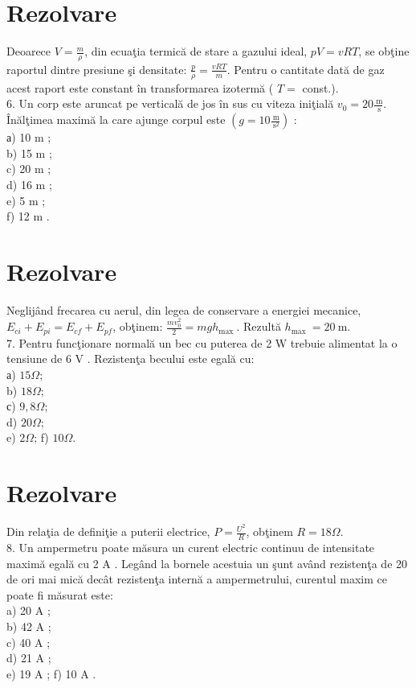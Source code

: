 \section*{Rezolvare}
Deoarece $V=\frac{m}{\rho}$, din ecuaţia termică de stare a gazului ideal, $p V=v R T$, se obţine raportul dintre presiune şi densitate: $\frac{p}{\rho}=\frac{v R T}{m}$. Pentru o cantitate dată de gaz acest raport este constant în transformarea izotermă ( $T=$ const.).\\
6. Un corp este aruncat pe verticală de jos în sus cu viteza iniţială $v_{0}=20 \frac{\mathrm{~m}}{\mathrm{~s}}$. Înălţimea maximă la care ajunge corpul este $\left(g=10 \frac{\mathrm{~m}}{\mathrm{~s}^{2}}\right)$ :\\
а) 10 m ;\\
b) 15 m ;\\
c) 20 m ;\\
d) 16 m ;\\
e) 5 m ;\\
f) 12 m .

\section*{Rezolvare}
Neglijând frecarea cu aerul, din legea de conservare a energiei mecanice, $E_{c i}+E_{p i}=E_{c f}+E_{p f}$, obţinem: $\frac{m v_{0}^{2}}{2}=m g h_{\text {max }}$. Rezultă $h_{\text {max }}=20 \mathrm{~m}$.\\
7. Pentru funcţionare normală un bec cu puterea de 2 W trebuie alimentat la o tensiune de 6 V . Rezistenţa becului este egală cu:\\
а) $15 \Omega$;\\
b) $18 \Omega$;\\
с) $9,8 \Omega$;\\
d) $20 \Omega$;\\
e) $2 \Omega$; f) $10 \Omega$.

\section*{Rezolvare}
Din relaţia de definiţie a puterii electrice, $P=\frac{U^{2}}{R}$, obţinem $R=18 \Omega$.\\
8. Un ampermetru poate măsura un curent electric continuu de intensitate maximă egală cu 2 A . Legând la bornele acestuia un şunt având rezistenţa de 20 de ori mai mică decât rezistenţa internă a ampermetrului, curentul maxim ce poate fi măsurat este:\\
a) 20 A ;\\
b) 42 A ;\\
c) 40 A ;\\
d) 21 A ;\\
e) 19 A ; f) 10 A .

